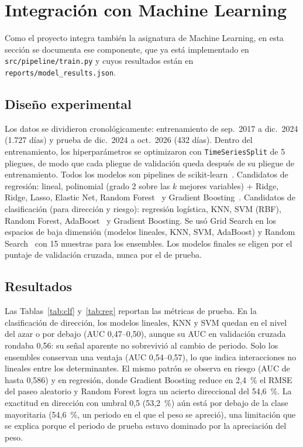 \documentclass[conference]{IEEEtran}
\begin{document}
\section{Integración con Machine Learning}
Como el proyecto integra también la asignatura de Machine Learning, en esta sección se documenta ese componente, que ya está implementado en \texttt{src/pipeline/train.py} y cuyos resultados están en \texttt{reports/model\_results.json}.
\subsection{Diseño experimental}
Los datos se dividieron cronológicamente: entrenamiento de sep.~2017 a dic.~2024 (1.727 días) y prueba de dic.~2024 a oct.~2026 (432 días). Dentro del entrenamiento, los hiperparámetros se optimizaron con \texttt{TimeSeriesSplit} de 5 pliegues, de modo que cada pliegue de validación queda después de su pliegue de entrenamiento. Todos los modelos son pipelines de scikit-learn~\cite{pedregosa2011}. Candidatos de regresión: lineal, polinomial (grado 2 sobre las $k$ mejores variables) + Ridge, Ridge, Lasso, Elastic Net, Random Forest~\cite{breiman2001} y Gradient Boosting~\cite{friedman2001}. Candidatos de clasificación (para dirección y riesgo): regresión logística, KNN, SVM (RBF), Random Forest, AdaBoost~\cite{freund1997} y Gradient Boosting. Se usó Grid Search en los espacios de baja dimensión (modelos lineales, KNN, SVM, AdaBoost) y Random Search~\cite{bergstra2012} con 15 muestras para los ensembles. Los modelos finales se eligen por el puntaje de validación cruzada, nunca por el de prueba.

\subsection{Resultados}
Las Tablas~\ref{tab:clf} y~\ref{tab:reg} reportan las métricas de prueba. En la clasificación de dirección, los modelos lineales, KNN y SVM quedan en el nivel del azar o por debajo (AUC 0,47--0,50), aunque su AUC en validación cruzada rondaba 0,56: su señal aparente no sobrevivió al cambio de periodo. Solo los ensembles conservan una ventaja (AUC 0,54--0,57), lo que indica interacciones no lineales entre los determinantes. El mismo patrón se observa en riesgo (AUC de hasta 0,586) y en regresión, donde Gradient Boosting reduce en 2,4~\% el RMSE del paseo aleatorio y Random Forest logra un acierto direccional del 54,6~\%. La exactitud en dirección con umbral 0,5 (53,2~\%) aún está por debajo de la clase mayoritaria (54,6~\%, un periodo en el que el peso se apreció), una limitación que se explica porque el periodo de prueba estuvo dominado por la apreciación del peso.
\end{document}
